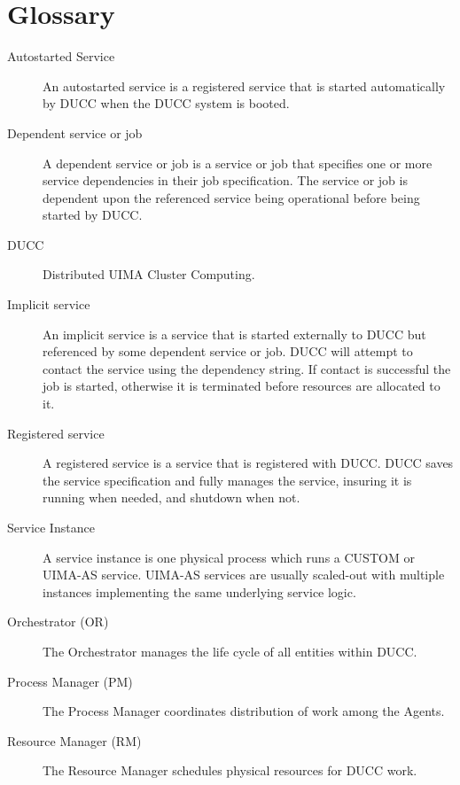 \ifpdf
\else
{}
\fi
\chapter{Glossary}

\begin{description}
\item[Autostarted Service] An autostarted service is a registered service that is started automatically
  by DUCC when the DUCC system is booted.

\item[Dependent service or job] A dependent service or job is a service or job that specifies one
  or more service dependencies in their job specification. The service or job is dependent upon the
  referenced service being operational before being started by DUCC.

\item[DUCC] Distributed UIMA Cluster Computing.

\item[Implicit service] An implicit service is a service that is started externally to DUCC but
  referenced by some dependent service or job.  DUCC will attempt to contact the service using
  the dependency string.  If contact is successful the job is started, otherwise it is 
  terminated before resources are allocated to it.

\item[Registered service] A registered service is a service that is registered with DUCC. DUCC
  saves the service specification and fully manages the service, insuring it is running when needed,
  and shutdown when not.

\item[Service Instance] A service instance is one physical process which runs a CUSTOM or UIMA-AS
  service.  UIMA-AS services are usually scaled-out with multiple instances implementing the
  same underlying service logic.

\item[Orchestrator (OR)] The Orchestrator manages the life cycle of all entities within DUCC.

\item[Process Manager (PM) ] The Process Manager coordinates distribution of work among the Agents.

\item[Resource Manager (RM) ] The Resource Manager schedules physical resources for DUCC work.


\end{description}
